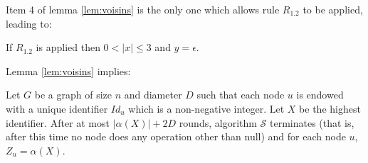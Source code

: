 \documentclass[11pt,envcountsame,letterpaper]{llncs}
\begin{document}
Item 4 of lemma \ref{lem:voisins} is the only one which allows rule $R_{1.2}$ to be applied, leading to:
\begin{corollary}
\label{cor:bound3}
If $R_{1.2}$ is applied then
$0<|x|\leq 3$ and $y=\epsilon$.
\end{corollary}

Lemma \ref{lem:voisins} implies:
\begin{theorem}\label{th:complexity}
Let $G$ be a graph of size $n$ and diameter $D$ such that each node $u$
is endowed with a unique identifier $Id_u$ which is a
non-negative
integer.
Let $X$ be the highest identifier.
After at most $|\alpha(X)|+2 D$ rounds,  algorithm $\mathcal S$ terminates
(that is, after this time no node does any operation other than null)
and for each node $u$, $Z_u=\alpha(X)$.
\end{theorem}
\end{document}
